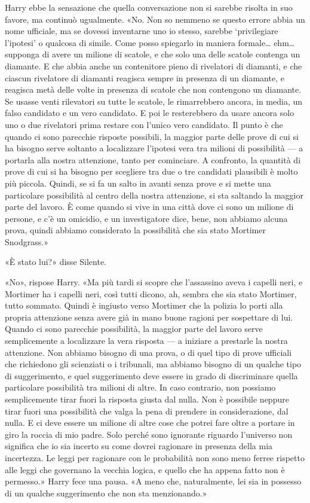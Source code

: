 Harry ebbe la sensazione che quella conversazione non si sarebbe risolta in suo favore, ma continuò ugualmente. «No. Non so nemmeno se questo errore abbia un nome ufficiale, ma se dovessi inventarne uno io stesso, sarebbe ‘privilegiare l’ipotesi’ o qualcosa di simile. Come posso spiegarlo in maniera formale… ehm… supponga di avere un milione di scatole, e che solo una delle scatole contenga un diamante. E che abbia anche un contenitore pieno di rivelatori di diamanti, e che ciascun rivelatore di diamanti reagisca sempre in presenza di un diamante, e reagisca metà delle volte in presenza di scatole che non contengono un diamante. Se usasse venti rilevatori su tutte le scatole, le rimarrebbero ancora, in media, un falso candidato e un vero candidato. E poi le resterebbero da usare ancora solo uno o due rivelatori prima restare con l’unico vero candidato. Il punto è che quando ci sono parecchie risposte possibili, la maggior parte delle prove di cui si ha bisogno serve soltanto a localizzare l’ipotesi vera tra milioni di possibilità — a portarla alla nostra attenzione, tanto per cominciare. A confronto, la quantità di prove di cui si ha bisogno per scegliere tra due o tre candidati plausibili è molto più piccola. Quindi, se si fa un salto in avanti senza prove e si mette una particolare possibilità al centro della nostra attenzione, si sta saltando la maggior parte del lavoro. È come quando si vive in una città dove ci sono un milione di persone, e c’è un omicidio, e un investigatore dice, bene, non abbiamo alcuna prova, quindi abbiamo considerato la possibilità che sia stato Mortimer Snodgrass.»

«È stato lui?» disse Silente.

«No», rispose Harry. «Ma più tardi si scopre che l’assassino aveva i capelli neri, e Mortimer ha i capelli neri, così tutti dicono, ah, sembra che sia stato Mortimer, tutto sommato. Quindi è ingiusto verso Mortimer che la polizia lo porti alla propria attenzione senza avere già in mano buone ragioni per sospettare di lui. Quando ci sono parecchie possibilità, la maggior parte del lavoro serve semplicemente a localizzare la vera risposta — a iniziare a prestarle la nostra attenzione. Non abbiamo bisogno di una prova, o di quel tipo di prove ufficiali che richiedono gli scienziati o i tribunali, ma abbiamo bisogno di un qualche tipo di suggerimento, e quel suggerimento deve essere in grado di discriminare quella particolare possibilità tra milioni di altre. In caso contrario, non possiamo semplicemente tirar fuori la risposta giusta dal nulla. Non è possibile neppure tirar fuori una possibilità che valga la pena di prendere in considerazione, dal nulla. E ci deve essere un milione di altre cose che potrei fare oltre a portare in giro la roccia di mio padre. Solo perché sono ignorante riguardo l’universo non significa che io sia incerto su come dovrei ragionare in presenza della mia incertezza. Le leggi per ragionare con le probabilità non sono meno ferree rispetto alle leggi che governano la vecchia logica, e quello che ha appena fatto non è permesso.» Harry fece una pausa. «A meno che, naturalmente, lei sia in possesso di un qualche suggerimento che non sta menzionando.»

